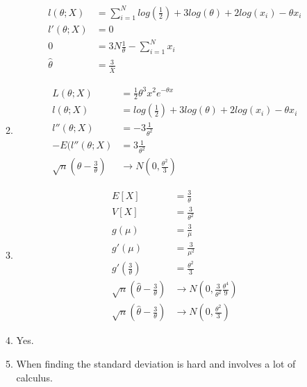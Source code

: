 \documentclass{article}
\begin{document}
\begin{enumerate}
\begin{enumerate}
\begin{equation*}
\begin{split}
		l(\theta;X) & =\sum_{i=1}^{N}  log(\frac{1}{2}) + 3 log(\theta) + 2 log(x_{i}) -\theta x_{i} \\
		l'(\theta;X) &  = 0 \\
		0 & = 3 N \frac{1}{\theta} - \sum_{i=1}^{N} x_{i} \\
		\hat{\theta} & = \frac{3}{\bar{X}}
		\end{split}
		\end{equation*}
	\item
		\begin{equation*}
		\begin{split}
		L(\theta;X) & =  \frac{1}{2} \theta^{3} x^{2} e^{-\theta x} \\
		l(\theta;X) & =  log(\frac{1}{2}) + 3 log(\theta) + 2 log(x_{i}) -\theta x_{i} \\
		l''(\theta;X) &  = -3 \frac{1}{\theta^{2}} \\
		-E(l''(\theta;X) & = 3 \frac{1}{\theta^{2}} \\
		\sqrt {n} (\hat{\theta} - \frac{3}{\theta}) &\rightarrow N(0, \frac{\theta^{2}}{3})
		\end{split}
		\end{equation*}
	\item
		\begin{equation*}
		\begin{split}
		E[X] & = \frac{3}{\theta} \\
		V[X] & = \frac{3}{\theta^{2}} \\	
		g(\mu) & = \frac{3}{\mu} \\
		g'(\mu) & = \frac{3}{\mu^{2}} \\
		g'(\frac{3}{\theta}) & = \frac{\theta^{2}}{3} \\
		\sqrt {n} (\hat{\theta} - \frac{3}{\theta}) &\rightarrow N(0, \frac{3}{\theta^{2}} \frac{\theta^{4}}{9}) \\
		\sqrt {n} (\hat{\theta} - \frac{3}{\theta}) &\rightarrow N(0, \frac{\theta^{2}}{3})
		\end{split}
		\end{equation*}
	\item
Yes.
	\item
When finding the standard deviation is hard and involves a lot of calculus.
	\end{enumerate}
\end{enumerate}
\end{document}
